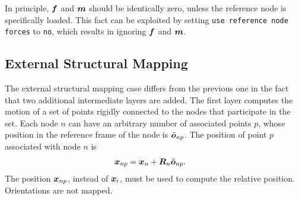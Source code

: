 In principle, $\bm{f}$ and $\bm{m}$ should be identically zero,
unless the reference node is specifically loaded.
This fact can be exploited by setting \texttt{use reference node forces}
to \texttt{no}, which results in ignoring $\bm{f}$ and $\bm{m}$.



\subsection{External Structural Mapping}
The external structural mapping case differs from the previous one
in the fact that two additional intermediate layers are added.
The first layer computes the motion of a set of points
rigidly connected to the nodes that participate in the set.
Each node $n$ can have an arbitrary number of associated points $p$,
whose position in the reference frame of the node is $\tilde{\bm{o}}_{np}$.
The position of point $p$ associated with node $n$ is
\begin{align}
	\bm{x}_{np}
	&=
	\bm{x}_n
	+
	\bm{R}_n \tilde{\bm{o}}_{np}
	\label{eq:forces:external-mapping:x_np}
	.
\end{align}
The position $\bm{x}_{np}$, instead of $\bm{x}_i$, must be used to compute
the relative position.
Orientations are not mapped.

